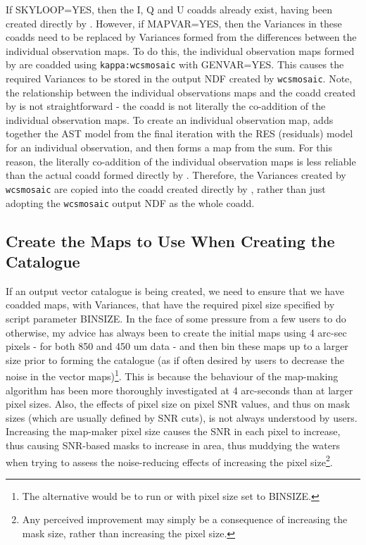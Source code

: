 \documentclass[twoside,11pt]{starlink}
\begin{document}
If SKYLOOP=YES, then the I, Q and U coadds already exist, having been created
directly by \sloop. However, if MAPVAR=YES, then the Variances
in these coadds need to be replaced by Variances formed from the differences
between the individual observation maps. To do this, the individual
observation maps formed by \sloop are coadded using
\texttt{kappa:wcsmosaic} with GENVAR=YES. This causes the required Variances
to be stored in the output NDF created by \texttt{wcsmosaic}. Note, the
relationship between the individual observations maps and the coadd
created by \sloop is not straightforward - the coadd is not
literally the co-addition of the individual observation maps. To create
an individual observation map, \sloop adds together the AST
model from the final iteration with the RES (residuals) model for an
individual observation, and then forms a map from the sum. For this
reason, the literally co-addition of the individual observation maps is
less reliable than the actual coadd formed directly by \sloop.
Therefore, the Variances created by \texttt{wcsmosaic} are copied into
the coadd created directly by \sloop, rather than just adopting
the \texttt{wcsmosaic} output NDF as the whole coadd.

\subsection{Create the Maps to Use When Creating the Catalogue}
If an output vector catalogue is being created, we need to ensure that we
have coadded maps, with Variances, that have the required pixel size specified
by script parameter BINSIZE. In the face of some pressure from a few users
to do otherwise, my advice has always been to create the
initial maps using 4 arc-sec pixels - for both 850 and 450 um data - and
then bin these maps up to a larger size prior to forming the catalogue
(as if often desired by users to decrease the noise in the vector
maps)\footnote{The alternative would be to run \mmap or
\sloop with pixel size set to BINSIZE.}.
This is because the behaviour of the map-making algorithm
has been more thoroughly investigated at 4 arc-seconds than at larger
pixel sizes. Also, the effects of pixel size on pixel SNR values, and thus
on mask sizes (which are usually defined by SNR cuts), is not always
understood by users. Increasing the map-maker pixel size causes the SNR
in each pixel to increase, thus causing SNR-based masks to increase in
area, thus muddying the waters when trying to assess the noise-reducing
effects of increasing the pixel size\footnote{Any perceived improvement
may simply be a consequence of increasing the mask size, rather than
increasing the pixel size.}.
\end{document}
